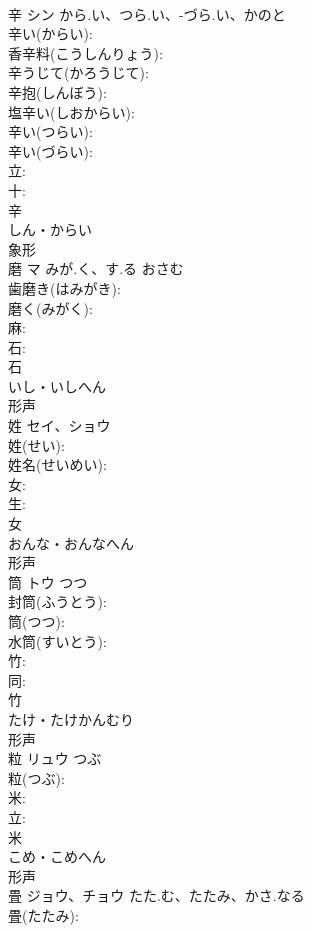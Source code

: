 \documentclass[8pt]{extreport}
\begin{document}
\begin{CJK}{UTF8}{min}
\\	辛	シン	から.い、つら.い、-づら.い、かのと		
\\	辛い(からい): 
\\	香辛料(こうしんりょう): 
\\	辛うじて(かろうじて): 
\\	辛抱(しんぼう): 
\\	塩辛い(しおからい): 
\\	辛い(つらい): 
\\	辛い(づらい): 
\\	立: 
\\	十: 
\\	辛	
\\	しん・からい	
\\	象形 
\\	磨	マ	みが.く、す.る	おさむ	
\\	歯磨き(はみがき): 
\\	磨く(みがく): 
\\	麻: 
\\	石: 
\\	石	
\\	いし・いしへん	
\\	形声 
\\	姓	セイ、ショウ			
\\	姓(せい): 
\\	姓名(せいめい): 
\\	女: 
\\	生: 
\\	女	
\\	おんな・おんなへん	
\\	形声 
\\	筒	トウ	つつ		
\\	封筒(ふうとう): 
\\	筒(つつ): 
\\	水筒(すいとう): 
\\	竹: 
\\	同: 
\\	竹	
\\	たけ・たけかんむり	
\\	形声 
\\	粒	リュウ	つぶ		
\\	粒(つぶ): 
\\	米: 
\\	立: 
\\	米	
\\	こめ・こめへん	
\\	形声 
\\	畳	ジョウ、チョウ	たた.む、たたみ、かさ.なる		
\\	畳(たたみ): 

\end{CJK}
\end{document}
